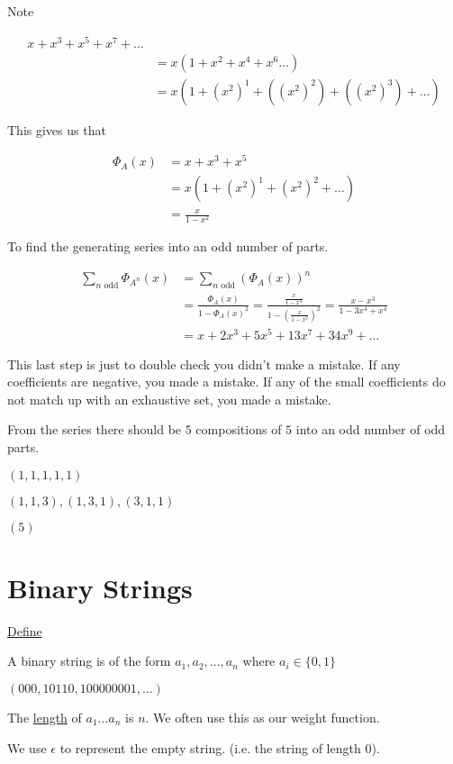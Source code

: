 \documentclass{article}
\begin{document}
Note

\begin{align*}
    x + x^3 + x^5 + x^7 + \ldots \\
    &= x(1 + x^2 + x^4 + x^6 \ldots ) \\
    &= x(1+(x^2)^1 + ((x^2)^2) + ((x^2)^3) + \ldots )
\end{align*}

This gives us that

\begin{align*}
    \Phi_{A}(x) &= x + x^3 + x^5 \\
    &= x(1+(x^2)^1 + (x^2)^2 + \ldots ) \\
    &= \frac{x}{1-x^2}
\end{align*}

To find the generating series into an odd number of parts.

\begin{align*}
    \sum_{n \text{ odd}}\Phi_{A^n}(x) &= \sum_{n \text{ odd}}(\Phi_{A}(x))^n \\
    &= \frac{\Phi_{A}(x)}{1-\Phi_{A}(x)^2} = \frac{\frac{x}{1-x^2}}{1-(\frac{x}{1-x^2})^2} = \frac{x-x^3}{1-3x^4+x^4} \\
    &= x+2x^3 + 5x^5 + 13x^7 + 34x^9 + \ldots
\end{align*}

This last step is just to double check you didn't make a mistake. If any coefficients are negative, you made a mistake. If any of the small coefficients do not match up with an exhaustive set, you made a mistake. 

From the series there should be $5$ compositions of $5$ into an odd number of odd parts.

$(1,1,1,1,1)$

$(1,1,3), (1,3,1), (3,1,1)$

$(5)$


\section{Binary Strings}

\underline{Define}

A binary string is of the form $a_1, a_2, \ldots, a_n$ where $a_i \in \{0,1\}$

$(000,10110,100000001,\ldots)$

The \underline{length} of $a_1 \ldots a_n$ is $n$. We often use this as our weight function. 

We use $\epsilon$ to represent the empty string. (i.e. the string of length $0$). 
\end{document}
